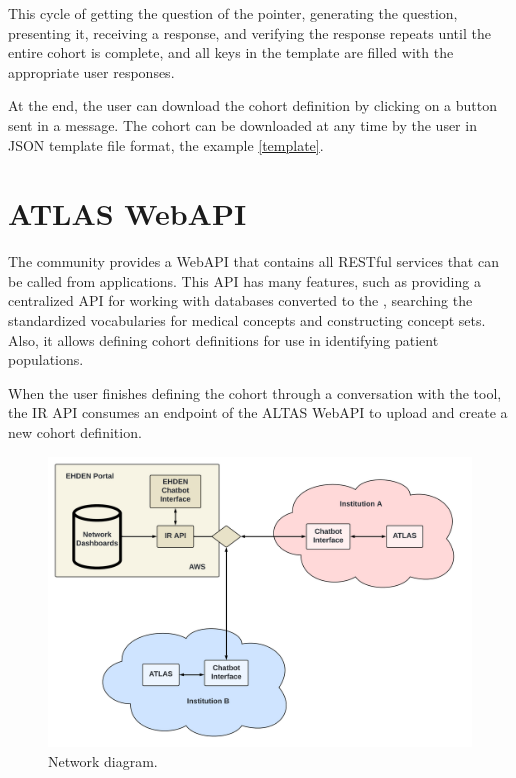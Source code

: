 This cycle of getting the question of the pointer, generating the question, presenting it, receiving a response, and verifying the response repeats until the entire cohort is complete, and all keys in the template are filled with the appropriate user responses.

At the end, the user can download the cohort definition by clicking on a button sent in a message. The cohort can be downloaded at any time by the user in JSON template file format, the example \ref{template}.



\section{ATLAS WebAPI}



The {\ohdsi} community provides a WebAPI that contains all {\ohdsi} RESTful services that can be called from {\ohdsi} applications. This API has many features, such as providing a centralized API for working with databases converted to the {\omop}, searching the {\omop} standardized vocabularies for medical concepts and constructing concept sets. Also, it allows defining cohort definitions for use in identifying patient populations.

When the user finishes defining the cohort through a conversation with the tool, the IR API consumes an endpoint of the ALTAS WebAPI to upload and create a new cohort definition.


\begin{figure}[H]
  \includegraphics[width=\textwidth]{figs/chapter4/network_diagram.png}
  \centering
  \caption{Network diagram.}
  \label{fig_network}
\end{figure}


